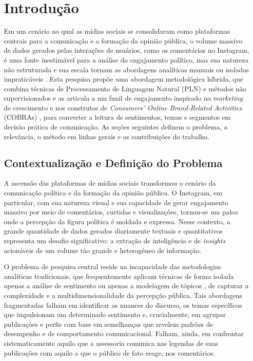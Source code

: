 \chapter{Introdução}\label{INTRODUÇÃO}

Em um cenário no qual as mídias sociais se consolidaram como plataformas centrais para a comunicação e a formação da opinião pública, o volume massivo de dados gerados pelas interações de usuários, como os comentários no Instagram, é uma fonte inestimável para a análise do engajamento político, mas sua natureza não estruturada e sua escala tornam as abordagens analíticas manuais ou isoladas impraticáveis \cite{irfan2015}. Esta pesquisa propõe uma abordagem metodológica híbrida, que combina técnicas de Processamento de Linguagem Natural (PLN) e métodos não supervisionados e as articula a um funil de engajamento inspirado no \emph{marketing} de crescimento \cite{feroz2024} e nos construtos de \emph{Consumers' Online Brand-Related Activities} (COBRAs) \cite{muntinga2011}, para converter a leitura de sentimentos, temas e segmentos em decisão prática de comunicação. As seções seguintes definem o problema, a relevância, o método em linhas gerais e as contribuições do trabalho.

\section{Contextualização e Definição do Problema}

A ascensão das plataformas de mídias sociais transformou o cenário da comunicação política e da formação da opinião pública. O Instagram, em particular, com sua natureza visual e sua capacidade de gerar engajamento massivo por meio de comentários, curtidas e visualizações, tornou-se um palco onde a percepção da figura política é moldada e expressa. Nesse contexto, a grande quantidade de dados gerados diariamente \textemdash{} textuais e quantitativos \textemdash{} representa um desafio significativo: a extração de inteligência e de \emph{insights} acionáveis de um volume tão grande e heterogêneo de informação.

O problema de pesquisa central reside na incapacidade das metodologias analíticas tradicionais, que frequentemente aplicam técnicas de forma isolada \textemdash{} apenas a análise de sentimento ou apenas a modelagem de tópicos \textemdash{}, de capturar a complexidade e a multidimensionalidade da percepção pública. Tais abordagens fragmentadas falham em identificar as nuances do discurso, os temas específicos que impulsionam um determinado sentimento e, crucialmente, em agrupar publicações e perfis com base em semelhanças que revelem padrões de desempenho e de comportamento comunicacional. Falham, ainda, em confrontar sistematicamente aquilo que a assessoria comunica \textemdash{} nas legendas de suas publicações \textemdash{} com aquilo a que o público de fato reage, nos comentários.

